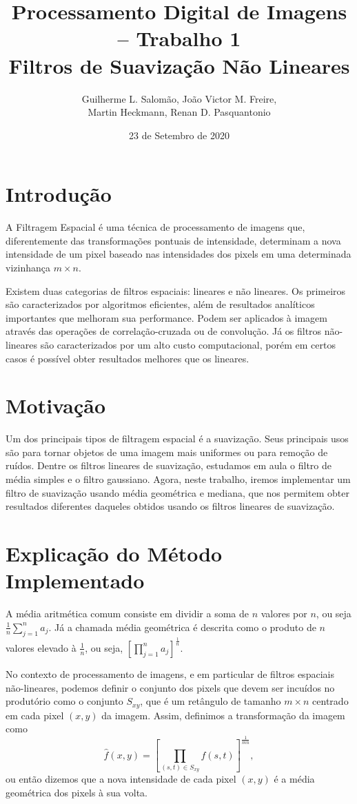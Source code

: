 \documentclass[12pt,a4paper]{article}
\title{Processamento Digital de Imagens – Trabalho 1\\Filtros de Suavização Não Lineares}
\author{Guilherme L. Salomão, João Victor M. Freire, \\Martin Heckmann, Renan D. Pasquantonio }
\date{23 de Setembro de 2020}
\begin{document}
\maketitle

\section{Introdução}

    A Filtragem Espacial é uma técnica de processamento de imagens que, diferentemente das transformações pontuais de intensidade, determinam a nova intensidade de um pixel baseado nas intensidades dos pixels em uma determinada vizinhança $m \times n$.
    
    Existem duas categorias de filtros espaciais: lineares e não lineares. Os primeiros são caracterizados por algoritmos eficientes, além de resultados analíticos importantes que melhoram sua performance. Podem ser aplicados à imagem através das operações de correlação-cruzada ou de convolução. Já os filtros não-lineares são caracterizados por um alto custo computacional, porém em certos casos é possível obter resultados melhores que os lineares.

\section{Motivação}
Um dos principais tipos de filtragem espacial é a suavização. Seus principais usos são para tornar objetos de uma imagem mais uniformes ou para remoção de ruídos. Dentre os filtros lineares de suavização, estudamos em aula o filtro de média simples e o filtro gaussiano. Agora, neste trabalho, iremos implementar um filtro de suavização usando média geométrica e mediana, que nos permitem obter resultados diferentes daqueles obtidos usando os filtros lineares de suavização.

\section{Explicação do Método Implementado}

A média aritmética comum consiste em dividir a soma de $n$ valores por $n$, ou seja $\frac{1}{n}\sum_{j=1}^{n} a_j$. Já a chamada média geométrica é descrita como o produto de $n$ valores elevado à $\frac{1}{n}$, ou seja, $[\prod_{j=1}^{n} a_j]^{\frac{1}{n}}$.

No contexto de processamento de imagens, e em particular de filtros espaciais não-lineares, podemos definir o conjunto dos pixels que devem ser incuídos no produtório como o conjunto $S_{xy}$, que é um retângulo de tamanho $m \times n$ centrado em cada pixel $(x,y)$ da imagem. Assim, definimos a transformação da imagem como $$\hat{f}(x, y) = [\prod _{(s,t) \in S_{xy}} f(s,t)]^{\frac{1}{mn}}, $$ ou então dizemos que a nova intensidade de cada pixel $(x, y)$ é a média geométrica dos pixels à sua volta.
\end{document}
